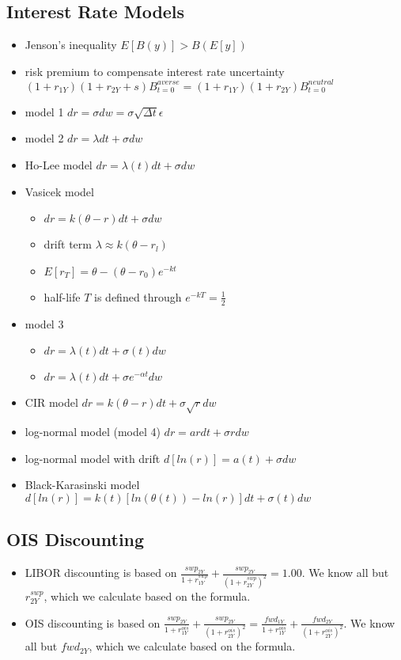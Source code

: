 \subsection{Interest Rate Models}
\begin{itemize}
	\item Jenson's inequality $E[B(y)] > B(E[y])$
	\item risk premium to compensate interest rate uncertainty $(1 + r_{1Y})(1 + r_{2Y} + s)B_{t = 0}^{averse} = (1 + r_{1Y})(1 + r_{2Y})B_{t = 0}^{neutral}$
	\item model 1 $dr = \sigma dw = \sigma \sqrt{\Delta t} \epsilon$
	\item model 2 $dr = \lambda dt + \sigma dw$
	\item Ho-Lee model $dr = \lambda(t) dt + \sigma dw$
	\item Vasicek model
	\begin{itemize}
		\item $dr = k(\theta - r)dt + \sigma dw$
		\item drift term $\lambda \approx k(\theta - r_l)$
		\item $E[r_T] = \theta - (\theta - r_0)e^{-kt}$
		\item half-life $T$ is defined through $e^{-kT} = \frac{1}{2}$
	\end{itemize}
	\item model 3
	\begin{itemize}
		\item $dr = \lambda(t)dt + \sigma(t)dw$
		\item $dr = \lambda(t)dt + \sigma e^{-\alpha t}dw$
	\end{itemize}
	\item CIR model $dr = k(\theta - r)dt + \sigma \sqrt{r}dw$
	\item log-normal model (model 4) $dr = ardt + \sigma r dw$
	\item log-normal model with drift $d[ln(r)] = a(t) + \sigma dw$
	\item Black-Karasinski model $d[ln(r)] = k(t)[ln(\theta(t)) - ln(r)]dt + \sigma(t) dw$
\end{itemize}

\subsection{OIS Discounting}
\begin{itemize}
	\item LIBOR discounting is based on $\frac{swp_{2Y}}{1 + r_{1Y}^{swp}} + \frac{swp_{2Y}}{(1 + r_{2Y}^{swp})^2} = 1.00$. We know all but $r_{2Y}^{swp}$, which we calculate based on the formula.
	\item OIS discounting is based on $\frac{swp_{2Y}}{1 + r_{1Y}^{ois}} + \frac{swp_{2Y}}{(1 + r_{2Y}^{ois})^2} = \frac{fwd_{1Y}}{1 + r_{1Y}^{ois}} + \frac{fwd_{2Y}}{(1 + r_{2Y}^{ois})^2}$. We know all but $fwd_{2Y}$, which we calculate based on the formula.
\end{itemize}

